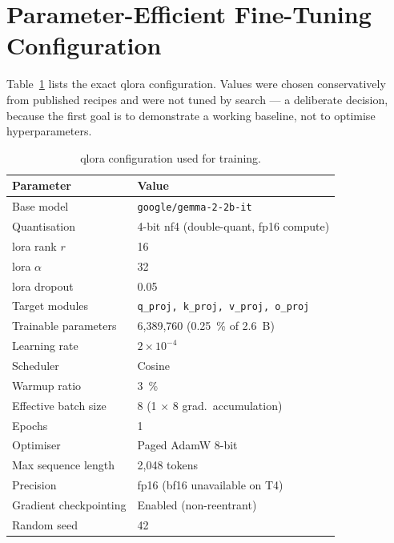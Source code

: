 \documentclass[12pt, a4paper]{report}
\begin{document}
\section{Parameter-Efficient Fine-Tuning Configuration}

Table~\ref{tab:qlora-config} lists the exact \gls{qlora} configuration.
Values were chosen conservatively from published recipes and were not
tuned by search --- a deliberate decision, because the first goal is to
demonstrate a working baseline, not to optimise hyperparameters.

\begin{table}[H]
  \centering
  \caption{\gls{qlora} configuration used for training.}
  \label{tab:qlora-config}
  \small
  \begin{tabular}{ll}
    \toprule
    \textbf{Parameter} & \textbf{Value} \\
    \midrule
    Base model              & \texttt{google/gemma-2-2b-it} \\
    Quantisation            & 4-bit \gls{nf4} (double-quant, fp16 compute) \\
    \gls{lora} rank \(r\)   & 16 \\
    \gls{lora} \(\alpha\)   & 32 \\
    \gls{lora} dropout      & 0.05 \\
    Target modules          & \texttt{q\_proj, k\_proj, v\_proj, o\_proj} \\
    Trainable parameters    & 6{,}389{,}760 (0.25~\% of 2.6~B) \\
    Learning rate           & $2 \times 10^{-4}$ \\
    Scheduler               & Cosine \\
    Warmup ratio            & 3~\% \\
    Effective batch size    & 8 (1 $\times$ 8 grad.\ accumulation) \\
    Epochs                  & 1 \\
    Optimiser               & Paged AdamW 8-bit \\
    Max sequence length     & 2{,}048 tokens \\
    Precision               & fp16 (bf16 unavailable on T4) \\
    Gradient checkpointing  & Enabled (non-reentrant) \\
    Random seed             & 42 \\
    \bottomrule
  \end{tabular}
\end{table}
\end{document}
